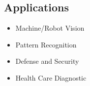 \documentclass[11pt, oneside]{Thesis} %
\begin{document}
\begin{titlepage}
			\section*{Applications}
			\begin{itemize}
				\itemsep0em 
 				 \item Machine/Robot Vision
 				 \item Pattern Recognition
 				 \item Defense and Security
 				 \item Health Care Diagnostic
			\end{itemize}
	\end{titlepage}







\renewcommand\bibname{References}

\label{References}
\end{document}
